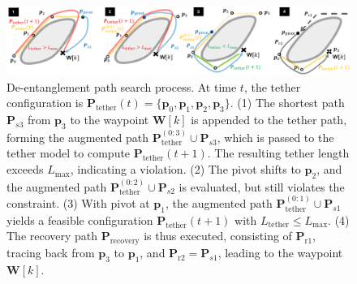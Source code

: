 \begin{figure}[t]
    \centering
    \includegraphics[width=\textwidth]{EA-Planner/figures/planner_newest1.pdf}
    \caption{De-entanglement path search process. At time \( t \), the tether configuration is \( \mathbf{P}_{\text{tether}}(t) = \{\mathbf{p}_0, \mathbf{p}_1, \mathbf{p}_2, \mathbf{p}_3\} \). 
    (1) The shortest path \( \mathbf{P}_{s3} \) from \( \mathbf{p}_3 \) to the waypoint \( \mathbf{W}[k] \) is appended to the tether path, forming the augmented path \( \mathbf{P}_{\text{tether}}^{(0:3)} \cup \mathbf{P}_{s3} \), which is passed to the tether model to compute \( \mathbf{P}_{\text{tether}}(t+1) \). The resulting tether length exceeds \( L_{\max} \), indicating a violation. 
    (2) The pivot shifts to \( \mathbf{p}_2 \), and the augmented path \( \mathbf{P}_{\text{tether}}^{(0:2)} \cup \mathbf{P}_{s2} \) is evaluated, but still violates the constraint. 
    (3) With pivot at \( \mathbf{p}_1 \), the augmented path \( \mathbf{P}_{\text{tether}}^{(0:1)} \cup \mathbf{P}_{s1} \) yields a feasible configuration \( \mathbf{P}_{\text{tether}}(t+1) \) with \( L_{\text{tether}} \leq L_{\max} \). 
    (4) The recovery path \( \mathbf{P}_{\text{recovery}} \)  is thus executed, consisting of \( \mathbf{P}_{\text{r}1} \), tracing back from \( \mathbf{p}_3 \) to \( \mathbf{p}_1 \), and \( \mathbf{P}_{\text{r}2} = \mathbf{P}_{s1} \), leading to the waypoint \( \mathbf{W}[k] \).}
    \label{fig:planner_search}
\end{figure}










